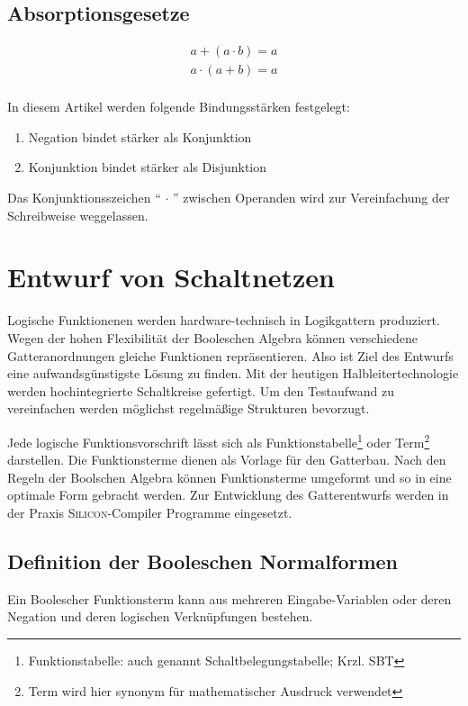 \subsection*{Absorptionsgesetze}
\begin{align*}
	a + (a \cdot b) = a \\
	a \cdot (a + b) = a \\
\end{align*}

In diesem Artikel werden folgende Bindungsstärken festgelegt:
\begin{enumerate}
\item
	Negation bindet stärker als Konjunktion
\item
	Konjunktion bindet stärker als Disjunktion
\end{enumerate}

Das Konjunktionsszeichen "` $\cdot$ "' zwischen Operanden wird zur Vereinfachung der Schreibweise weggelassen.

\section{Entwurf von Schaltnetzen}
Logische Funktionenen werden hardware-technisch in Logikgattern produziert. Wegen der hohen Flexibilität der Booleschen Algebra können verschiedene Gatteranordnungen gleiche Funktionen repräsentieren. Also ist Ziel des Entwurfs eine aufwandsgünstigste Lösung zu finden. Mit der heutigen Halbleitertechnologie werden hochintegrierte Schaltkreise gefertigt. Um den Testaufwand zu vereinfachen werden möglichst regelmäßige Strukturen bevorzugt.

Jede logische Funktionsvorschrift lässt sich als Funktionstabelle\footnote{Funktionstabelle: auch genannt Schaltbelegungstabelle; Krzl. SBT} oder Term\footnote{Term wird hier synonym für mathematischer Ausdruck verwendet} darstellen. Die Funktionsterme dienen als Vorlage für den Gatterbau. Nach den Regeln der Boolschen Algebra können Funktionsterme umgeformt und so in eine optimale Form gebracht werden. Zur Entwicklung des Gatterentwurfs werden in der Praxis \textsc{Silicon}-Compiler Programme eingesetzt.

\subsection{Definition der Booleschen Normalformen}
Ein Boolescher Funktionsterm kann aus mehreren Eingabe-Variablen oder deren Negation und deren logischen Verknüpfungen bestehen.

